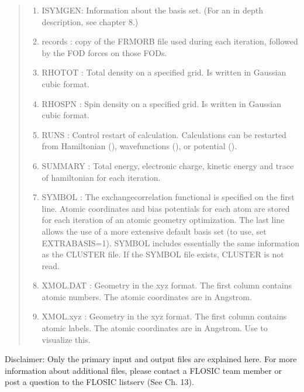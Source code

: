 \documentclass[letterpaper,10pt,english,openany,oneside]{sphinxmanual}
\begin{document}
\begin{quote}
\begin{enumerate}
\item {} 
\sphinxAtStartPar
ISYMGEN: Information about the basis set. (For an in depth description, see chapter 8.)

\item {} 
\sphinxAtStartPar
records  : copy of the FRMORB file used during each iteration, followed by the FOD forces on those FODs.

\item {} 
\sphinxAtStartPar
RHOTOT  : Total density on a specified grid. Is written in Gaussian cubic format.

\item {} 
\sphinxAtStartPar
RHOSPN  : Spin density on a specified grid. Is written in Gaussian cubic format.

\item {} 
\sphinxAtStartPar
RUNS    :  Control restart of calculation. Calculations can be restarted from Hamiltonian (), wavefunctions (), or potential ().

\item {} 
\sphinxAtStartPar
SUMMARY : Total energy, electronic charge, kinetic energy and trace of hamiltonian for each
iteration.

\item {} 
\sphinxAtStartPar
SYMBOL : The exchange\sphinxhyphen{}correlation functional is specified on the first line. Atomic coordinates and bias potentials for each atom are stored for each
iteration of an atomic geometry optimization. The last line allows the use of a more extensive default basis set (to use, set EXTRABASIS=1).
SYMBOL includes essentially the same information as the CLUSTER file. If the SYMBOL file exists, CLUSTER is not read.

\item {} 
\sphinxAtStartPar
XMOL.DAT : Geometry in the xyz format. The first column contains atomic numbers. The atomic coordinates are in Angstrom.

\item {} 
\sphinxAtStartPar
XMOL.xyz : Geometry in the xyz format. The first column contains atomic labels. The atomic coordinates are in Angstrom. Use  to visualize this.

\end{enumerate}
\end{quote}

\sphinxAtStartPar
Disclaimer: Only the primary input and output files are explained here. For more information about additional files, please contact a FLOSIC team member or post a question to the FLOSIC listserv (See Ch. 13).
\end{document}
